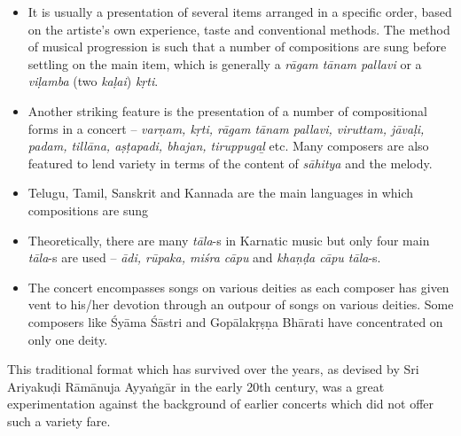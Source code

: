 \begin{itemize}
\itemsep=0pt
\item It is usually a presentation of several items arranged in a specific order, based on the artiste’s own experience, taste and conventional methods. The method of musical progression is such that a number of compositions are sung before settling on the main item, which is generally a \textit{rāgam tānam pallavi} or a \textit{viḷamba} (two \textit{kaḷai}) \textit{kṛti}.

 \item Another striking feature is the presentation of a number of compositional forms in a concert – \textit{varṇam, kṛti, rāgam tānam pallavi, viruttam, jāvaḷi, padam, tillāna, aṣṭapadi, bhajan, tiruppugaḻ} etc. Many composers are also featured to lend variety in terms of the content of \textit{sāhitya} and the melody.

 \item Telugu, Tamil, Sanskrit and Kannada are the main languages in which compositions are sung

 \item Theoretically, there are many \textit{tāla}-s in Karnatic music but only four main \textit{tāla}-s are used – \textit{ādi, rūpaka, miśra cāpu} and \textit{khaṇḍa cāpu tāla}-s.

 \item The concert encompasses songs on various deities as each composer has given vent to his/her devotion through an outpour of songs on various deities. Some composers like Śyāma Śāstri and Gopālakṛṣṇa Bhārati have concentrated on only one deity.

\end{itemize}

This traditional format which has survived over the years, as devised by Sri Ariyakuḍi Rāmānuja Ayyaṅgār in the early 20th century, was a great experimentation against the background of earlier concerts which did not offer such a variety fare.


